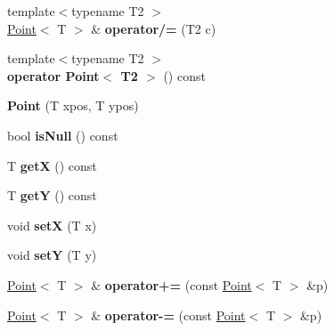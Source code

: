 \begin{DoxyCompactItemize}
\item 
\hypertarget{class_point_a1eea2586fd60dc3afd91fa48a2243d34}{
{\footnotesize template$<$typename T2 $>$ }\\\hyperlink{class_point}{Point}$<$ T $>$ \& {\bfseries operator/=} (T2 c)}
\label{class_point_a1eea2586fd60dc3afd91fa48a2243d34}

\item 
\hypertarget{class_point_ae81e26af57b63fc89ed704b1035cf149}{
{\footnotesize template$<$typename T2 $>$ }\\{\bfseries operator Point$<$ T2 $>$} () const }
\label{class_point_ae81e26af57b63fc89ed704b1035cf149}

\item 
\hypertarget{class_point_afee21757359d199f4c69d9701e1dc7e2}{
{\bfseries Point} (T xpos, T ypos)}
\label{class_point_afee21757359d199f4c69d9701e1dc7e2}

\item 
\hypertarget{class_point_ac9b271484c83c7e1d9a6f07ab11f3f68}{
bool {\bfseries isNull} () const }
\label{class_point_ac9b271484c83c7e1d9a6f07ab11f3f68}

\item 
\hypertarget{class_point_ae414e3bdd4f00190e7c4a999e9020f6c}{
T {\bfseries getX} () const }
\label{class_point_ae414e3bdd4f00190e7c4a999e9020f6c}

\item 
\hypertarget{class_point_a6b5641f2ef6c44b88f14276150dce919}{
T {\bfseries getY} () const }
\label{class_point_a6b5641f2ef6c44b88f14276150dce919}

\item 
\hypertarget{class_point_a0e395ed682dce1b506117001ad7b4359}{
void {\bfseries setX} (T x)}
\label{class_point_a0e395ed682dce1b506117001ad7b4359}

\item 
\hypertarget{class_point_af95aee5daa3bc93b4eb31867f4be5a2b}{
void {\bfseries setY} (T y)}
\label{class_point_af95aee5daa3bc93b4eb31867f4be5a2b}

\item 
\hypertarget{class_point_a2c82fe84181ba81c0cb13f42b2e5f8f6}{
\hyperlink{class_point}{Point}$<$ T $>$ \& {\bfseries operator+=} (const \hyperlink{class_point}{Point}$<$ T $>$ \&p)}
\label{class_point_a2c82fe84181ba81c0cb13f42b2e5f8f6}

\item 
\hypertarget{class_point_a97420680779305d8ff418154432d18e6}{
\hyperlink{class_point}{Point}$<$ T $>$ \& {\bfseries operator-\/=} (const \hyperlink{class_point}{Point}$<$ T $>$ \&p)}
\label{class_point_a97420680779305d8ff418154432d18e6}


\end{DoxyCompactItemize}
